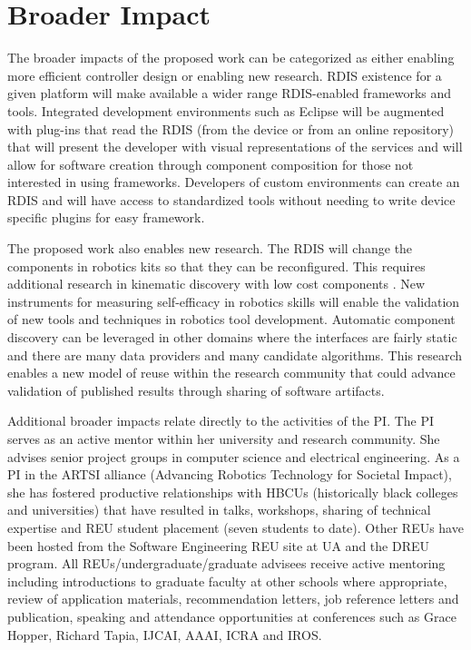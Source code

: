 
\section{Broader Impact}\label{sec:bi}

The broader impacts of the proposed work can be categorized as either enabling more efficient controller design or enabling new research.   RDIS existence for a given platform will make available a wider range RDIS-enabled frameworks and tools.  Integrated development environments such as Eclipse will be augmented with plug-ins that read the RDIS (from the device or from an online repository) that will present the developer with visual representations of the services and will allow for software creation through component composition for those not interested in using frameworks.  Developers of custom environments can create an RDIS and will have access to standardized tools without needing to write device specific plugins for easy framework.   

The proposed work also enables new research.  The RDIS will change the components in robotics kits so that they can be reconfigured.  This requires additional research in kinematic discovery with low cost components \cite{Croxell2008}.  New instruments for measuring self-efficacy in robotics skills will enable the validation of new tools and techniques in robotics tool development.  Automatic component discovery can be leveraged in other domains where the interfaces are fairly static and there are many data providers and many candidate algorithms.  This research enables a new model of reuse within the research community that could advance validation of published results through sharing of software artifacts. 

Additional broader impacts relate directly to the activities of the PI.  The PI serves as an active mentor within her university and research community.  She advises senior project groups in computer science and electrical engineering.  As a PI in the ARTSI alliance (Advancing Robotics Technology for Societal Impact), she has fostered productive relationships with HBCUs (historically black colleges and universities) that have resulted in talks, workshops, sharing of technical expertise and REU student placement (seven students to date).  Other REUs have been hosted from the Software Engineering REU site at UA and the DREU program. All REUs/undergraduate/graduate advisees receive active mentoring including introductions to graduate faculty at other schools where appropriate, review of application materials, recommendation letters, job reference letters and publication, speaking and attendance opportunities at conferences such as Grace Hopper, Richard Tapia, IJCAI, AAAI, ICRA and IROS.

